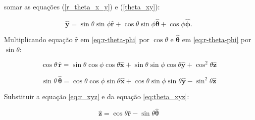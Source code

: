 \documentclass[a4paper,12pt]{article}
\newcommand{\printingbibliography}{%

    \pagestyle{myheadings}
    \markright{}
    \sloppy
    \printbibliography[heading=bibintoc, %
                   title=Refer\^encias %
                  ]
    \fussy%
}
\begin{document}
somar as equações (\ref{r_theta_x_y}) e (\ref{theta_xy}):

\begin{equation}
\hat{\mathbf{y}} = \sin\theta \sin\phi \hat{\mathbf{r}} + \cos\theta \sin\phi \hat{\bm{\theta}} + \cos\phi\hat{\bm{\phi}}.
\end{equation}

Multiplicando equação $\hat{\mathbf{r}}$ em  \ref{eq:r-theta-phi} por $\cos\theta$ e $\hat{\bm{\theta}}$ em \ref{eq:r-theta-phi} por $\sin\theta$:

\begin{equation}\label{eq:r_xyz}
\cos\theta \, \hat{\mathbf{r}} = \sin\theta \cos\phi \cos\theta \hat{\mathbf{x}} + \sin\theta \sin\phi \cos\theta \hat{\mathbf{y}} + \cos^{2}\theta \hat{\mathbf{z}}
\end{equation}

\begin{equation}\label{eq:theta_xyz}
\sin\theta \, \hat{\bm{\theta}} = \cos\theta \cos\phi \sin\theta \hat{\mathbf{x}} + \cos\theta \sin\phi \sin\theta \hat{\mathbf{y}} - \sin^{2}\theta  \hat{\mathbf{z}}
\end{equation}

Substituir a equa\c{c}\~ao \ref{eq:r_xyz} e da equa\c{c}\~ao \ref{eq:theta_xyz}:

\begin{equation}
\hat{\mathbf{z}} = \cos\theta \hat{\mathbf{r}} - \sin\theta \hat{\bm{\theta}}
\end{equation}


\end{document}
